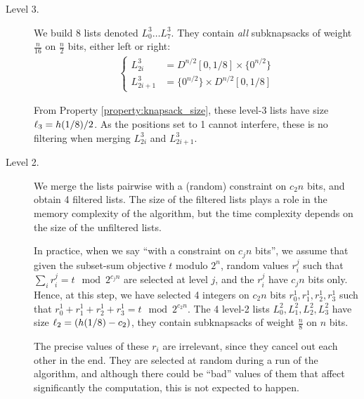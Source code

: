 \begin{description}
\item[Level 3.] We build 8 lists denoted $L_0^3 \ldots L_7^3$. They contain \emph{all} subknapsacks of weight $\frac{n}{16}$ on $\frac{n}{2}$ bits, either left or right:
\begin{align*}
\left\{ \begin{matrix}
L_{2i}^3 & = D^{n/2}[0, 1/8] \times \{ 0^{n/2} \} \\
L_{2i+1}^3 & =  \{ 0^{n/2} \} \times D^{n/2}[0, 1/8] 
\end{matrix} \right.
\end{align*}

From Property \ref{property:knapsack_size}, these level-3 lists have size $\ell_3 =  h(1/8) / 2$. As the positions set to 1 cannot interfere, these is no filtering when merging $L_{2i}^3$ and $L_{2i+1}^3$.
\item[Level 2.] We merge the lists pairwise with a (random) constraint on $c_2 n$ bits, and obtain 4 filtered lists. The size of the filtered lists plays a role in the memory complexity of the algorithm, but the time complexity depends on the size of the unfiltered lists.

In practice, when we say ``with a constraint on $c_j n$ bits'', we assume that given the subset-sum objective $t$ modulo $2^n$, random values $r_i^j$ such that $\sum_i r_i^j = t \mod{2^{c_jn}}$ are selected at level $j$, and the $r_i^j$ have $c_j n$ bits only. Hence, at this step, we have selected 4 integers on $c_2 n$ bits $r^1_0, r^1_1, r^1_2, r^1_3$ such that $r^1_0 + r^1_1 + r^1_2 + r^1_3 = t \mod{2^{c_2n}}$. The 4 level-2 lists $L_0^2, L_1^2, L_2^2, L_3^2$ have size $\ell_2 = (h(1/8) - c_2)$, they contain subknapsacks of weight $\frac{n}{8}$ on $n$ bits.

\begin{remark}
The precise values of these $r_i$ are irrelevant, since they cancel out each other in the end. They are selected at random during a run of the algorithm, and although there could be ``bad'' values of them that affect significantly the computation, this is not expected to happen.
\end{remark}


\end{description}
